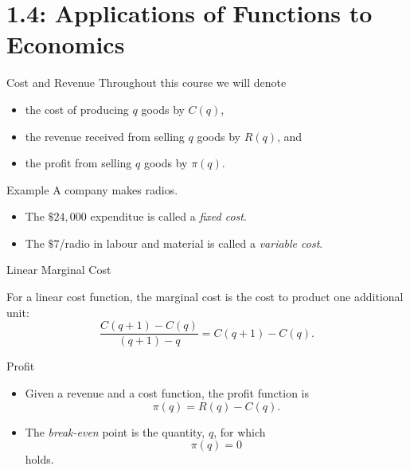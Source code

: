 \documentclass[Lecture.tex]{subfiles}
\begin{document}
\section{1.4: Applications of Functions to Economics}

\begin{frame}{Cost and Revenue}
  Throughout this course we will denote
  \begin{itemize}
    \item<2->
      the cost of producing $q$ goods by $C(q)$,
    \item<3->
      the revenue received from selling $q$ goods by $R(q)$, and
    \item<4->
      the profit from selling $q$ goods by $\pi(q)$.
  \end{itemize}
\end{frame}

\begin{frame}{Example}
  A company makes radios.
  \begin{itemize}
  \item<5->
    The $\$24,000$ expenditue is called a {\it fixed cost}.
  \item<6->
    The $\$7$/radio in labour and material is called a {\it variable cost}.
  \end{itemize}
\end{frame}

\begin{frame}{Linear Marginal Cost}
  \begin{defn}
    For a linear cost function, the marginal cost is the cost to product one additional unit:
    $$\frac{C(q + 1) - C(q)}{(q + 1) - q} = C(q + 1) - C(q).$$
  \end{defn}
\end{frame}

\begin{frame}{Profit}
  \begin{defn}
    \begin{itemize}
    \item<1->
      Given a revenue and a cost function, the profit function is
      $$\pi(q) = R(q) - C(q).$$
    \item<2->
      The {\it break-even} point is the quantity, $q$, for which
      $$\pi(q) = 0$$
      holds.
    \end{itemize}
  \end{defn}
\end{frame}
\end{document}

